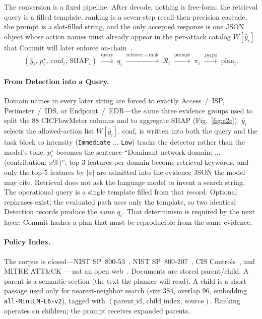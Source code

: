 The conversion is a fixed pipeline. After decode, nothing is free-form: the retrieval query is a filled template, ranking is a seven-step recall-then-precision cascade, the prompt is a slot-filled string, and the only accepted response is one JSON object whose action names must already appear in the per-attack catalog $W[\hat{y}_i]$ that Commit will later enforce on-chain~\cite{li2025}.
\begin{equation}
(\hat{y}_i,\, p_i^{\star},\, \mathrm{conf}_i,\, \mathrm{SHAP}_i)
\;\xrightarrow{\mathrm{query}}\;
q_i
\;\xrightarrow{\mathrm{retrieve+rank}}\;
\mathcal{R}_i
\;\xrightarrow{\mathrm{prompt}}\;
\pi_i
\;\xrightarrow{\mathrm{JSON}}\;
\mathrm{plan}_i.
\end{equation}

\paragraph{From Detection into a Query.}
Domain names in every later string are forced to exactly Access~/~ISP, Perimeter~/~IDS, or Endpoint~/~EDR---the same three evidence groups used to split the 88 CICFlowMeter columns and to aggregate SHAP (Fig.~\ref{fig:e2e}). $\hat{y}_i$ selects the allowed-action list $W[\hat{y}_i]$. $\mathrm{conf}_i$ is written into both the query and the task block so intensity (\texttt{Immediate} $\ldots$ \texttt{Low}) tracks the detector rather than the model's tone. $p_i^{\star}$ becomes the sentence ``Dominant network domain: $\ldots$ (contribution: $x\%$)''; top-3 features per domain become retrieval keywords, and only the top-5 features by $\lvert\phi\rvert$ are admitted into the evidence JSON the model may cite. Retrieval does not ask the language model to invent a search string. The operational query is a single template filled from that record. Optional rephrases exist; the evaluated path uses only the template, so two identical Detection records produce the same $q_i$. That determinism is required by the next layer: Commit hashes a plan that must be reproducible from the same evidence.

\paragraph{Policy Index.}
The corpus is closed---NIST SP~800-53~\cite{nist80053}, NIST SP~800-207~\cite{nist800207}, CIS Controls~\cite{cisv8}, and MITRE ATT\&CK~\cite{mitre_attack}---not an open web~\cite{shajarian2026,fu2026}. Documents are stored parent/child. A parent is a semantic section (the text the planner will read). A child is a short passage used only for nearest-neighbor search (size $384$, overlap $96$, embedding \texttt{all-MiniLM-L6-v2}), tagged with $(\mathrm{parent\_id},\,\mathrm{child\_index},\,\mathrm{source})$. Ranking operates on children; the prompt receives expanded parents.

